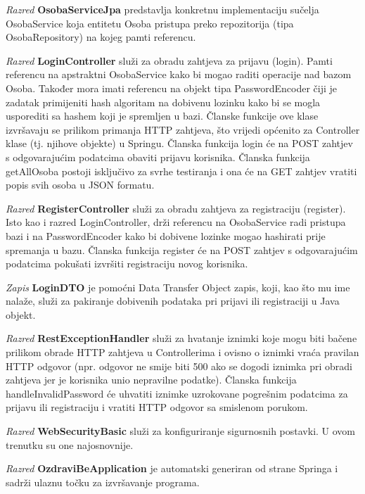 			\textit{Razred }\textbf{OsobaServiceJpa}
			 predstavlja konkretnu implementaciju sučelja OsobaService koja entitetu Osoba
			pristupa preko repozitorija (tipa OsobaRepository) na kojeg pamti referencu.

			\textit{Razred }\textbf{LoginController}
			 služi za obradu zahtjeva za prijavu (login).
			Pamti referencu na apstraktni OsobaService kako bi mogao raditi operacije nad bazom Osoba.
			Također mora imati referencu na objekt tipa PasswordEncoder čiji je zadatak primijeniti hash algoritam
			na dobivenu lozinku kako bi se mogla usporediti sa hashem koji je spremljen u bazi. Članske funkcije 
			ove klase izvršavaju se prilikom primanja HTTP zahtjeva, što vrijedi općenito za Controller klase
			(tj. njihove objekte) u Springu. Članska funkcija login će na POST zahtjev s odgovarajućim podatcima
			obaviti prijavu korisnika. Članska funkcija getAllOsoba postoji isključivo za svrhe testiranja i ona će na GET zahtjev vratiti popis svih osoba
			u JSON formatu. 

			\textit{Razred }\textbf{RegisterController}
			 služi za obradu zahtjeva za registraciju (register).
			Isto kao i razred LoginController, drži referencu na OsobaService radi pristupa bazi i na PasswordEncoder
			kako bi dobivene lozinke mogao hashirati prije spremanja u bazu. Članska funkcija register će na POST
			zahtjev s odgovarajućim podatcima pokušati izvršiti registraciju novog korisnika. 

			\textit{Zapis }\textbf{LoginDTO}
			 je pomoćni Data Transfer Object zapis, koji, kao što mu ime nalaže, služi za pakiranje
			dobivenih podataka pri prijavi ili registraciji u Java objekt. 

			\textit{Razred }\textbf{RestExceptionHandler}
			 služi za hvatanje iznimki koje mogu biti bačene prilikom obrade HTTP zahtjeva u Controllerima i ovisno o iznimki
			vraća pravilan HTTP odgovor (npr. odgovor ne smije biti 500 ako se dogodi iznimka pri obradi zahtjeva jer je korisnika
			unio nepravilne podatke). Članska funkcija handleInvalidPassword će uhvatiti iznimke uzrokovane
			pogrešnim podatcima za prijavu ili registraciju i vratiti HTTP odgovor sa smislenom porukom.

			\textit{Razred }\textbf{WebSecurityBasic}
			 služi za konfiguriranje sigurnosnih postavki. U ovom trenutku su one najosnovnije.

			\textit{Razred }\textbf{OzdraviBeApplication}
			 je automatski generiran od strane Springa i sadrži ulaznu točku za izvršavanje programa.

